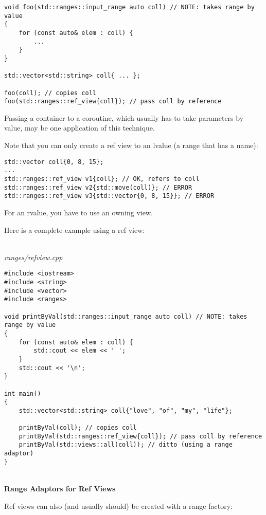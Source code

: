 \begin{lstlisting}[style=styleCXX]
void foo(std::ranges::input_range auto coll) // NOTE: takes range by value
{
	for (const auto& elem : coll) {
		...
	}
}

std::vector<std::string> coll{ ... };

foo(coll); // copies coll
foo(std::ranges::ref_view{coll}); // pass coll by reference
\end{lstlisting}

Passing a container to a coroutine, which usually has to take parameters by value, may be one application of this technique.

Note that you can only create a ref view to an lvalue (a range that has a name):

\begin{lstlisting}[style=styleCXX]
std::vector coll{0, 8, 15};
...
std::ranges::ref_view v1{coll}; // OK, refers to coll
std::ranges::ref_view v2{std::move(coll)}; // ERROR
std::ranges::ref_view v3{std::vector{0, 8, 15}}; // ERROR
\end{lstlisting}

For an rvalue, you have to use an owning view.

Here is a complete example using a ref view:

\noindent
\hspace*{\fill} \\ %
\textit{ranges/refview.cpp}

\begin{lstlisting}[style=styleCXX]
#include <iostream>
#include <string>
#include <vector>
#include <ranges>

void printByVal(std::ranges::input_range auto coll) // NOTE: takes range by value
{
	for (const auto& elem : coll) {
		std::cout << elem << ' ';
	}
	std::cout << '\n';
}

int main()
{
	std::vector<std::string> coll{"love", "of", "my", "life"};
	
	printByVal(coll); // copies coll
	printByVal(std::ranges::ref_view{coll}); // pass coll by reference
	printByVal(std::views::all(coll)); // ditto (using a range adaptor)
}
\end{lstlisting}

\noindent
\hspace*{\fill} \\ %
\textbf{Range Adaptors for Ref Views}

Ref views can also (and usually should) be created with a range factory:

